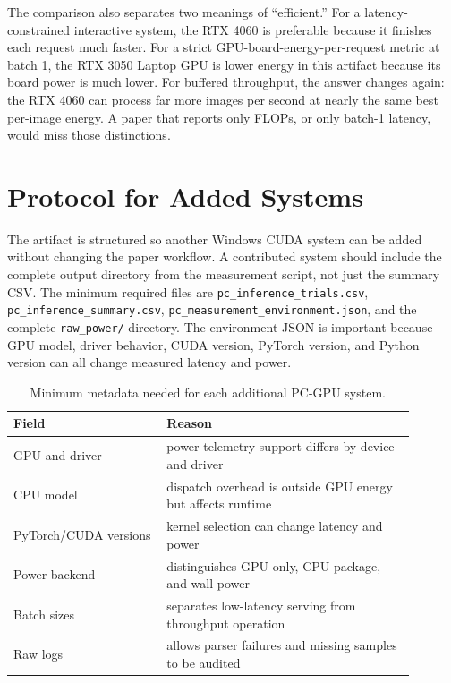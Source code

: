 \documentclass[conference]{IEEEtran}
\begin{document}
The comparison also separates two meanings of ``efficient.'' For a
latency-constrained interactive system, the RTX 4060 is preferable because it
finishes each request much faster. For a strict GPU-board-energy-per-request
metric at batch 1, the RTX 3050 Laptop GPU is lower energy in this artifact
because its board power is much lower. For buffered throughput, the answer
changes again: the RTX 4060 can process far more images per second at nearly
the same best per-image energy. A paper that reports only FLOPs, or only
batch-1 latency, would miss those distinctions.

\section{Protocol for Added Systems}

The artifact is structured so another Windows CUDA system can be added without
changing the paper workflow. A contributed system should include the complete
output directory from the measurement script, not just the summary CSV. The
minimum required files are \texttt{pc\_inference\_trials.csv},
\texttt{pc\_inference\_summary.csv},
\texttt{pc\_measurement\_environment.json}, and the complete
\texttt{raw\_power/} directory. The environment JSON is important because GPU
model, driver behavior, CUDA version, PyTorch version, and Python version can
all change measured latency and power.

\begin{table}[t]
\centering
\caption{Minimum metadata needed for each additional PC-GPU system.}
\label{tab:metadata}
\scriptsize
\begin{tabular}{@{}L{0.34\linewidth}L{0.55\linewidth}@{}}
\toprule
Field & Reason\\
\midrule
GPU and driver & power telemetry support differs by device and driver\\
CPU model & dispatch overhead is outside GPU energy but affects runtime\\
PyTorch/CUDA versions & kernel selection can change latency and power\\
Power backend & distinguishes GPU-only, CPU package, and wall power\\
Batch sizes & separates low-latency serving from throughput operation\\
Raw logs & allows parser failures and missing samples to be audited\\
\bottomrule
\end{tabular}
\end{table}
\end{document}
